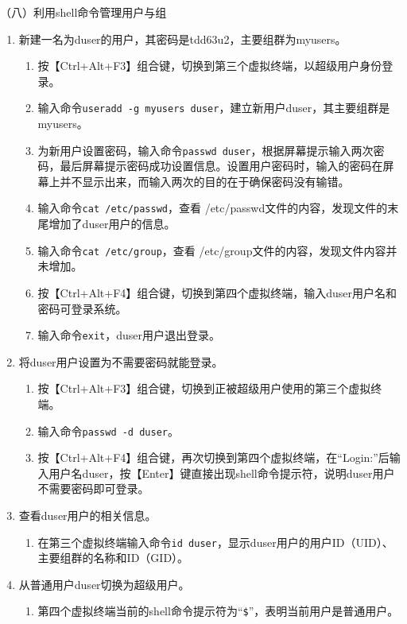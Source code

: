 \vspace{0.1in}
（八）利用shell命令管理用户与组
\begin{enumerate}
  \item 新建一名为duser的用户，其密码是tdd63u2，主要组群为myusers。
    \begin{enumerate}
      \item 按【Ctrl+Alt+F3】组合键，切换到第三个虚拟终端，以超级用户身份登录。
      \item 输入命令\verb|useradd -g myusers duser|，建立新用户duser，其主要组群是myusers。
      \item 为新用户设置密码，输入命令\verb|passwd duser|，根据屏幕提示输入两次密码，最后屏幕提示密码成功设置信息。设置用户密码时，输入的密码在屏幕上并不显示出来，而输入两次的目的在于确保密码没有输错。
      \item 输入命令\verb|cat /etc/passwd|，查看 /etc/passwd文件的内容，发现文件的末尾增加了duser用户的信息。
      \item 输入命令\verb|cat /etc/group|，查看 /etc/group文件的内容，发现文件内容并未增加。
      \item 按【Ctrl+Alt+F4】组合键，切换到第四个虚拟终端，输入duser用户名和密码可登录系统。
      \item 输入命令\verb|exit|，duser用户退出登录。
    \end{enumerate}
  \item 将duser用户设置为不需要密码就能登录。
    \begin{enumerate}
      \item 按【Ctrl+Alt+F3】组合键，切换到正被超级用户使用的第三个虚拟终端。
      \item 输入命令\verb|passwd -d duser|。
      \item 按【Ctrl+Alt+F4】组合键，再次切换到第四个虚拟终端，在“Login:”后输入用户名duser，按【Enter】键直接出现shell命令提示符，说明duser用户不需要密码即可登录。
    \end{enumerate}
  \item 查看duser用户的相关信息。
    \begin{enumerate}
      \item 在第三个虚拟终端输入命令\verb|id duser|，显示duser用户的用户ID（UID）、主要组群的名称和ID（GID）。
    \end{enumerate}
  \item 从普通用户duser切换为超级用户。
    \begin{enumerate}
      \item 第四个虚拟终端当前的shell命令提示符为“\verb|$|”，表明当前用户是普通用户。

\end{enumerate}
\end{enumerate}
